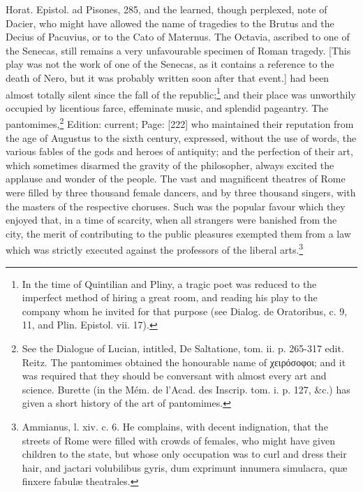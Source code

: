 {Horat. Epistol. ad Pisones, 285, and the learned, though perplexed, note of Dacier, who might have allowed the name of tragedies to the Brutus and the Decius of Pacuvius, or to the Cato of Maternus. The Octavia, ascribed to one of the Senecas, still remains a very unfavourable specimen of Roman tragedy. [This play was not the work of one of the Senecas, as it contains a reference to the death of Nero, but it was probably written soon after that event.]} had been almost totally silent since the fall of the republic;\footnote{In the time of Quintilian and Pliny, a tragic poet was reduced to the imperfect method of hiring a great room, and reading his play to the company whom he invited for that purpose (see Dialog. de Oratoribus, c. 9, 11, and Plin. Epistol. vii. 17).} and their place was unworthily occupied by licentious farce, effeminate music, and splendid pageantry. The pantomimes,\footnote{See the Dialogue of Lucian, intitled, De Saltatione, tom. ii. p. 265-317 edit. Reitz. The pantomimes obtained the honourable name of \textgreek{χειρόσοφοι}; and it was required that they should be conversant with almost every art and science. Burette (in the Mém. de l\texthebrew{}’Acad. des Inscrip. tom. i. p. 127, \&c.) has given a short history of the art of pantomimes.} Edition: current; Page: [222] who maintained their reputation from the age of Augustus to the sixth century, expressed, without the use of words, the various fables of the gods and heroes of antiquity; and the perfection of their art, which sometimes disarmed the gravity of the philosopher, always excited the applause and wonder of the people. The vast and magnificent theatres of Rome were filled by three thousand female dancers, and by three thousand singers, with the masters of the respective choruses. Such was the popular favour which they enjoyed that, in a time of scarcity, when all strangers were banished from the city, the merit of contributing to the public pleasures exempted them from a law which was strictly executed against the professors of the liberal arts.\footnote{Ammianus, l. xiv. c. 6. He complains, with decent indignation, that the streets of Rome were filled with crowds of females, who might have given children to the state, but whose only occupation was to curl and dress their hair, and jactari volubilibus gyris, dum exprimunt innumera simulacra, quæ finxere fabulæ theatrales.}

